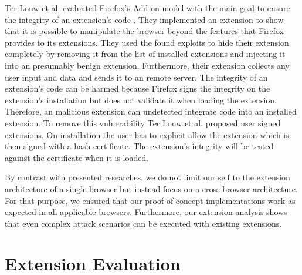 	Ter Louw et al. evaluated Firefox's Add-on model with the main goal to ensure the integrity of an extension's code \cite{TerLouw:2007:EWB:1420581.1420583}. They implemented an extension to show that it is possible to manipulate the browser beyond the features that Firefox provides to its extensions. They used the found exploits to hide their extension completely by removing it from the list of installed extensions and injecting it into an presumably benign extension. Furthermore, their extension collects any user input and data and sends it to an remote server. The integrity of an extension's code can be harmed because Firefox signs the integrity on the extension's installation but does not validate it when loading the extension. Therefore, an malicious extension can undetected integrate code into an installed extension. To remove this vulnerability Ter Louw et al. proposed user signed extensions. On installation the user has to explicit allow the extension which is then signed with a hash certificate. The extension's integrity will be tested against the certificate when it is loaded. 

	By contrast with presented researches, we do not limit our self to the extension architecture of a single browser but instead focus on a cross-browser architecture. For that purpose, we ensured that our proof-of-concept implementations work as expected in all applicable browsers. Furthermore, our extension analysis shows that even complex attack scenarios can be executed with existing extensions.
	
\section{Extension Evaluation} 
	
